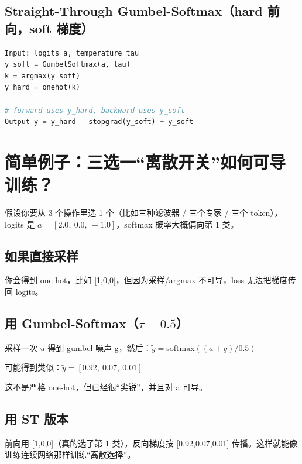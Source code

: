 \subsection{Straight-Through Gumbel-Softmax（hard 前向，soft 梯度）}

\begin{lstlisting}[language=python]
Input: logits a, temperature tau
y_soft = GumbelSoftmax(a, tau)
k = argmax(y_soft)
y_hard = onehot(k)

# forward uses y_hard, backward uses y_soft
Output y = y_hard - stopgrad(y_soft) + y_soft
\end{lstlisting}

\section{简单例子：三选一“离散开关”如何可导训练？}

假设你要从 3 个操作里选 1 个（比如三种滤波器 / 三个专家 / 三个 token），logits 是 \(a=[2.0,\ 0.0,\ -1.0]\)，softmax 概率大概偏向第 1 类。

\subsection{如果直接采样}

你会得到 one-hot，比如 [1,0,0]，但因为采样/argmax 不可导，loss 无法把梯度传回 logits。

\subsection{用 Gumbel-Softmax（\(\tau=0.5\)）}

采样一次 \(u\) 得到 gumbel 噪声 g，然后：\(\tilde{y}=\text{softmax}((a+g)/0.5)\)

可能得到类似：\(\tilde{y}=[0.92,\ 0.07,\ 0.01]\)

这不是严格 one-hot，但已经很“尖锐”，并且对 a 可导。

\subsection{用 ST 版本}

前向用 [1,0,0]（真的选了第 1 类），反向梯度按 [0.92,0.07,0.01] 传播。这样就能像训练连续网络那样训练“离散选择”。
